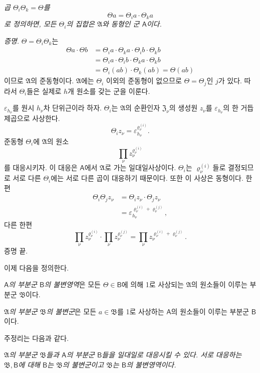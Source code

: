 \emph{곱 \(\Theta_i\Theta_k=\Theta\)를}
\[
        \Theta a=\Theta_i a\cdot\Theta_k a
\]
\emph{로 정의하면, 모든 \(\Theta_i\)의 집합은 \(\mathfrak A\)와 동형인 군 \(\mathsf A\)이다.}

\emph{증명.} \(\Theta=\Theta_i\Theta_k\)는
\[
\begin{aligned}
\Theta a\cdot\Theta b
&=\Theta_i a\cdot\Theta_k a\cdot
  \Theta_i b\cdot\Theta_k b\\
&=\Theta_i a\cdot\Theta_i b\cdot
  \Theta_k a\cdot\Theta_k b\\
&=\Theta_i(ab)\cdot\Theta_k(ab)
 =\Theta(ab)
\end{aligned}
\]
이므로 \(\mathfrak A\)의 준동형이다. \(\mathfrak A\)에는 \(\Theta_i\) 이외의 준동형이 없으므로 \(\Theta=\Theta_j\)인 \(j\)가 있다. 따라서 \(\Theta_i\)들은 실제로 \(h\)개 원소를 갖는 군을 이룬다.

\(\varepsilon_{h_\nu}\)를 원시 \(h_\nu\)차 단위근이라 하자. \(\Theta_i\)는 \(\mathfrak A\)의 순환인자 \(\mathfrak Z_\nu\)의 생성원 \(z_\nu\)를 \(\varepsilon_{h_\nu}\)의 한 거듭제곱으로 사상한다.
\[
        \Theta_i z_\nu
        =\varepsilon_{h_\nu}^{\varrho_\nu^{(i)}}.
\]
준동형 \(\Theta_i\)에 \(\mathfrak A\)의 원소
\[
        \prod_\nu z_\nu^{\varrho_\nu^{(i)}}
\]
를 대응시키자. 이 대응은 \(\mathsf A\)에서 \(\mathfrak A\)로 가는 일대일사상이다. \(\Theta_i\)는 \(\varrho_\nu^{(i)}\)들로 결정되므로 서로 다른 \(\Theta_i\)에는 서로 다른 곱이 대응하기 때문이다. 또한 이 사상은 동형이다. 한편
\[
\begin{aligned}
\Theta_i\Theta_j z_\nu
&=\Theta_i z_\nu\cdot\Theta_j z_\nu\\
&=\varepsilon_{h_\nu}^{
  \varrho_\nu^{(i)}+\varrho_\nu^{(j)}},
\end{aligned}
\]
다른 한편
\[
\prod_\nu z_\nu^{\varrho_\nu^{(i)}}
\cdot
\prod_\nu z_\nu^{\varrho_\nu^{(j)}}
=\prod_\nu z_\nu^{
\varrho_\nu^{(i)}+\varrho_\nu^{(j)}}.
\]
증명 끝.

이제 다음을 정의한다.

\emph{\(\mathsf A\)의 부분군 \(\mathsf B\)의 불변영역}은 모든 \(\Theta\in\mathsf B\)에 의해 1로 사상되는 \(\mathfrak A\)의 원소들이 이루는 부분군 \(\mathfrak B\)이다.

\emph{\(\mathfrak A\)의 부분군 \(\mathfrak B\)의 불변군}은 모든 \(a\in\mathfrak B\)를 1로 사상하는 \(\mathsf A\)의 원소들이 이루는 부분군 \(\mathsf B\)이다.

주정리는 다음과 같다.

\emph{\(\mathfrak A\)의 부분군 \(\mathfrak B\)들과 \(\mathsf A\)의 부분군 \(\mathsf B\)들을 일대일로 대응시킬 수 있다. 서로 대응하는 \(\mathfrak B,\mathsf B\)에 대해 \(\mathsf B\)는 \(\mathfrak B\)의 불변군이고 \(\mathfrak B\)는 \(\mathsf B\)의 불변영역이다.}

